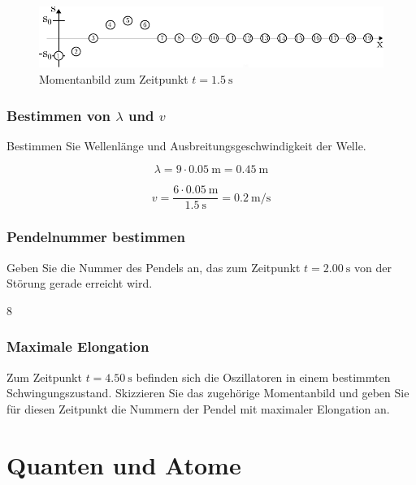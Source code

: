 \documentclass{ajc}
\begin{document}
	\begin{figure}[ht]
		\centering
		\includegraphics[width=\textwidth]{ph_004_momentanbild_1-5s.pdf}
		\caption{Momentanbild zum Zeitpunkt $t = \SI{1,5}{\second}$}
		\label{fig:mom_1.5s}
	\end{figure}
	
	\subsubsection{Bestimmen von $\lambda$ und $v$}
	Bestimmen Sie Wellenlänge und Ausbreitungsgeschwindigkeit der Welle.
	
	\begin{equation}
		\lambda = 9 \cdot \SI{0,05}{\m} = \SI{0,45}{\m}
	\end{equation}
	
	\begin{equation}
		v = \frac{6 \cdot \SI{0,05}{\m}}{\SI{1,5}{\s}} = \SI{0,2}{\m\per\s}
	\end{equation}
	
	\subsubsection{Pendelnummer bestimmen}
	Geben Sie die Nummer des Pendels an, das zum Zeitpunkt $t = \SI{2,00}{\second}$ von der Störung gerade erreicht wird.
	
	$8$
	
	\subsubsection{Maximale Elongation}
	Zum Zeitpunkt $t = \SI{4,50}{\second}$ befinden sich die Oszillatoren in einem bestimmten Schwingungszustand. Skizzieren Sie das zugehörige Momentanbild und geben Sie für diesen Zeitpunkt die Nummern der Pendel mit maximaler Elongation an.
	
	\section{Quanten und Atome}
\end{document}

